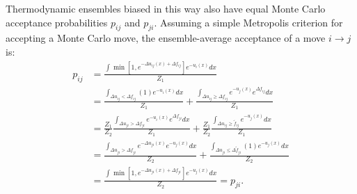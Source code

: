 \documentclass[%
 aip,
rsi,%
 amsmath,amssymb,
 reprint,%
]{revtex4-1}
\begin{document}
Thermodynamic ensembles biased in this way also have equal Monte Carlo acceptance probabilities $p_{ij}$ and $p_{ji}$.  Assuming a simple Metropolis criterion for accepting a Monte Carlo move, the ensemble-average acceptance of a move $i \rightarrow j$ is:
\begin{align}
    p_{ij} &= \frac{ \int \min [ 1, e^{-\Delta u_{ij}(x) + \Delta f_{ij} } ] e^{-u_i(x)} dx} {Z_1} \\
    &= \frac{\int_{\Delta u_{ij} < \Delta f_{ij} } (1) e^{-u_i(x)} dx}{Z_1} + \frac{\int_{\Delta u_{ij} \geq \Delta f_{ij} } e^{-u_j(x)} e^{\Delta f_{ij}} dx}{Z_1} \\
    &=  \frac{Z_1}{Z_2} \frac{\int_{\Delta u_{ji} > \Delta f_{ji} } e^{-u_i(x)} e^{\Delta f_{ji}} dx}{Z_1} + \frac{Z_1}{Z_2} \frac{\int_{\Delta u_{ij} \geq \tilde{f}_{ij} } e^{-u_j(x)} dx}{Z_1} \\
    &=  \frac{\int_{\Delta u_{ji} > \Delta f_{ji} } e^{-\Delta u_{ji}(x)} e^{-u_j(x)} dx}{Z_2} + \frac{\int_{\Delta u_{ji} \leq \Delta \tilde{f}_{ji} } (1) e^{-u_j(x)} dx}{Z_2} \\
    &= \frac{ \int \min [ 1, e^{-\Delta u_{ji}(x) + \Delta f_{ji} } ] e^{-u_j(x)} dx} {Z_2} = p_{ji}. \\
\end{align}




\newpage


\end{document}
